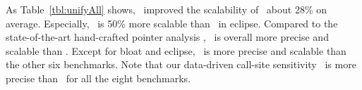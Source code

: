 As Table~\ref{tbl:unifyAll} shows, \ourtool~improved the scalability of \callSL~about 28\% on average. Especially, \callSLG~is 50\% more scalable than \callSL~in eclipse. Compared to the state-of-the-art hand-crafted pointer analysis \BatonUnity, \callSLG~is overall more precise and scalable than \BatonUnity. Except for bloat and eclipse, \callSLG~is more precise and scalable than the other six benchmarks. Note that our data-driven call-site sensitivity \callSL~is more precise than \BatonUnity~for all the eight benchmarks.





